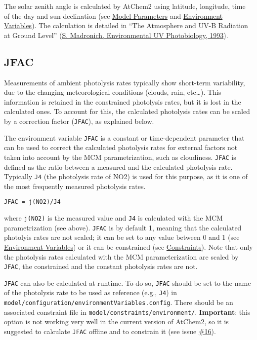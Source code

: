 The solar zenith angle is calculated by AtChem2 using latitude,
longitude, time of the day and sun declination (see
\hyperref[sec:parameters]{Model Parameters} and
\hyperref[sec:envvar]{Environment Variables}). The calculation is
detailed in ``The Atmosphere and UV-B Radiation at Ground Level''
(\href{https://doi.org//10.1007/978-1-4899-2406-3_1}{S.  Madronich,
  Environmental UV Photobiology, 1993}).

\subsection{JFAC} \label{subsec:jfac}

Measurements of ambient photolysis rates typically show short-term
variability, due to the changing meteorological conditions (clouds,
rain, etc\ldots{}). This information is retained in the constrained
photolysis rates, but it is lost in the calculated ones. To account
for this, the calculated photolysis rates can be scaled by a
correction factor (\texttt{JFAC}), as explained below.

The environment variable \texttt{JFAC} is a constant or time-dependent
parameter that can be used to correct the calculated photolysis rates
for external factors not taken into account by the MCM
parametrization, such as cloudiness. \texttt{JFAC} is defined as the
ratio between a measured and the calculated photolysis rate. Typically
\texttt{J4} (the photolysis rate of NO2) is used for this purpose, as
it is one of the most frequently measured photolysis rates.

\begin{verbatim}
JFAC = j(NO2)/J4
\end{verbatim}

where \texttt{j(NO2)} is the measured value and \texttt{J4} is
calculated with the MCM parametrization (see above). \texttt{JFAC} is
by default 1, meaning that the calculated photolyis rates are not
scaled; it can be set to any value between 0 and 1 (see
\hyperref[sec:envvar]{Environment Variables}) or it can be constrained
(see \hyperref[sec:constraints]{Constraints}). Note that only the
photolysis rates calculated with the MCM parameterization are scaled
by \texttt{JFAC}, the constrained and the constant photolysis rates
are not.

\texttt{JFAC} can also be calculated at runtime. To do so,
\texttt{JFAC} should be set to the name of the photolysis rate to be
used as reference (e.g., \texttt{J4}) in
\texttt{model/configuration/environmentVariables.config}. There should
be an associated constraint file in
\texttt{model/constraints/environment/}. \textbf{Important}: this
option is not working very well in the current version of AtChem2, so
it is suggested to calculate \texttt{JFAC} offline and to constrain it
(see issue \href{https://github.com/AtChem/AtChem2/issues/16}{\#16}).

